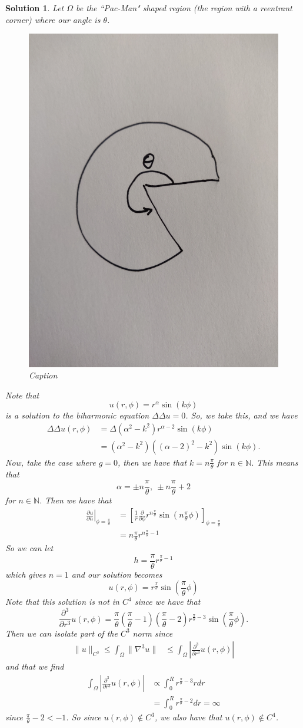 \documentclass[leqno]{article}
\theoremstyle{nonumberplain}
\newtheorem{solution}{Solution}
\newcommand{\N}{\mathbb{N}}
\begin{document}
\begin{solution}
Let $\Omega$ be the ``Pac-Man" shaped region (the region with a reentrant corner) where our angle is $\theta$.
\begin{figure}[h]
    \centering
    \includegraphics[width=.4\textwidth]{IMG_20190404_165308.jpg}
    \caption{Caption}
    \label{fig:my_label}
\end{figure}
Note that 
\[
u(r,\phi) = r^\alpha \sin (k\phi)
\]
is a solution to the biharmonic equation $\Delta \Delta u = 0$.  So, we take this, and we have
\begin{align*}
    \Delta \Delta u(r,\phi) &= \Delta (\alpha^2-k^2)r^{\alpha -2} \sin(k \phi)\\
    &= (\alpha^2-k^2)((\alpha-2)^2-k^2)\sin(k\phi).
\end{align*}
Now, take the case where $g=0$, then we have that $k=n\frac{\pi}{\theta}$ for $n\in \N$. This means that
\[
\alpha = \pm n\frac{\pi}{\theta}, ~\pm n\frac{\pi}{\theta}+2
\]
for $n\in \N$.  Then we have that
\begin{align*}
\left.\frac{\partial u}{\partial n} \right\vert_{\phi=\frac{\pi}{\theta}} &= \left[\frac{1}{r}\frac{\partial }{\partial \phi}r^{n\frac{\pi}{\theta}}\sin\left(n\frac{\pi}{\theta}\phi\right)\right]_{\phi=\frac{\pi}{\theta}}\\
&= n\frac{\pi}{\theta}r^{n\frac{\pi}{\theta}-1}
\end{align*}
So we can let
\[
h=\frac{\pi}{\theta}r^{\frac{\pi}{\theta}-1}
\]
which gives $n=1$ and our solution becomes
\[
u(r,\phi) = r^{\frac{\pi}{\theta}}\sin\left(\frac{\pi}{\theta}\phi\right)
\]
Note that this solution is not in $C^4$ since we have that
\[
\frac{\partial^3}{\partial r^3} u(r,\phi) = \frac{\pi}{\theta} \left( \frac{\pi}{\theta}-1\right) \left( \frac{\pi}{\theta}-2\right) r^{\frac{\pi}{\theta}-3} \sin\left(\frac{\pi}{\theta} \phi \right).
\]
Then we can isolate part of the $C^3$ norm since
\begin{align*}
    \|u\|_{C^3}\leq \int_\Omega \|\nabla^3 u\| &\leq \int_\Omega \left|\frac{\partial^3}{\partial r^3} u(r,\phi)\right|
\end{align*}
and that we find
\begin{align*}
\int_\Omega \left|\frac{\partial^3}{\partial r^3} u(r,\phi)\right| &\propto \int_0^R r^{\frac{\pi}{\theta}-3} r dr\\
&= \int_0^R r^{\frac{\pi}{\theta}-2} dr = \infty
\end{align*}
since $\frac{\pi}{\theta}-2 < -1$. So since $u(r,\phi) \notin C^3$, we also have that $u(r,\phi)\notin C^4$. 



\end{solution}
\end{document}
